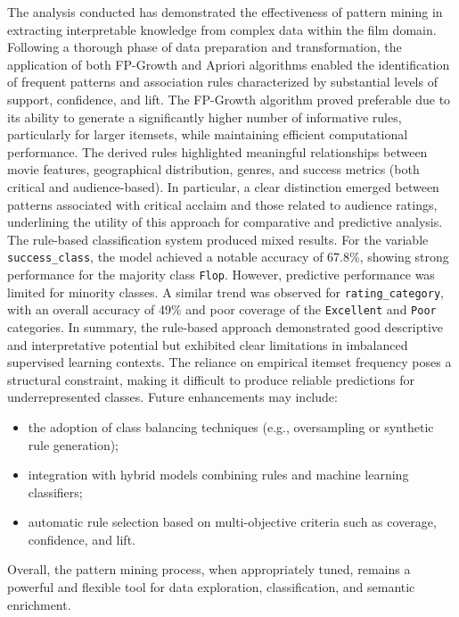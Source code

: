 \documentclass[10pt]{article}
\begin{document}
The analysis conducted has demonstrated the effectiveness of pattern mining in extracting interpretable knowledge from complex data within the film domain. Following a thorough phase of data preparation and transformation, the application of both FP-Growth and Apriori algorithms enabled the identification of frequent patterns and association rules characterized by substantial levels of support, confidence, and lift.
The FP-Growth algorithm proved preferable due to its ability to generate a significantly higher number of informative rules, particularly for larger itemsets, while maintaining efficient computational performance.
The derived rules highlighted meaningful relationships between movie features, geographical distribution, genres, and success metrics (both critical and audience-based). In particular, a clear distinction emerged between patterns associated with critical acclaim and those related to audience ratings, underlining the utility of this approach for comparative and predictive analysis.
The rule-based classification system produced mixed results. For the variable \texttt{success\_class}, the model achieved a notable accuracy of 67.8\%, showing strong performance for the majority class \texttt{Flop}. However, predictive performance was limited for minority classes. A similar trend was observed for \texttt{rating\_category}, with an overall accuracy of 49\% and poor coverage of the \texttt{Excellent} and \texttt{Poor} categories.
In summary, the rule-based approach demonstrated good descriptive and interpretative potential but exhibited clear limitations in imbalanced supervised learning contexts. The reliance on empirical itemset frequency poses a structural constraint, making it difficult to produce reliable predictions for underrepresented classes.
Future enhancements may include:
\begin{itemize}
\item the adoption of class balancing techniques (e.g., oversampling or synthetic rule generation);
\item integration with hybrid models combining rules and machine learning classifiers;
\item automatic rule selection based on multi-objective criteria such as coverage, confidence, and lift.
\end{itemize}

Overall, the pattern mining process, when appropriately tuned, remains a powerful and flexible tool for data exploration, classification, and semantic enrichment.
\end{document}
